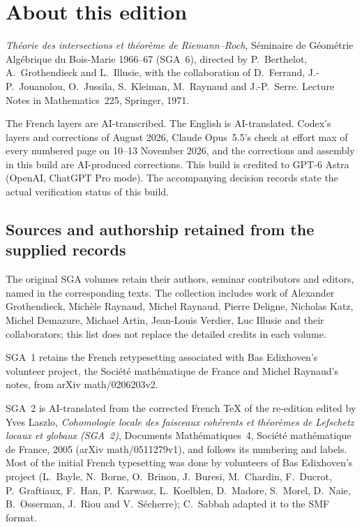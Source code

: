\section*{About this edition}
\textit{Théorie des intersections et théorème de Riemann--Roch},
Séminaire de Géométrie Algébrique du Bois-Marie 1966--67 (SGA~6),
directed by P.~Berthelot, A.~Grothendieck and L.~Illusie, with the collaboration
of D.~Ferrand, J.-P.~Jouanolou, O.~Jussila, S.~Kleiman, M.~Raynaud and
J.-P.~Serre. Lecture Notes in Mathematics~225, Springer, 1971.

The French layers are AI-transcribed. The English is AI-translated.
Codex's layers and corrections of August 2026, Claude Opus~5.5's check at
effort max of every numbered page on 10--13 November 2026, and the corrections
and assembly in this build are AI-produced corrections. This build is credited
to GPT-6 Astra (OpenAI, ChatGPT Pro mode). The accompanying decision records
state the actual verification status of this build.

\subsection*{Sources and authorship retained from the supplied records}
The original SGA volumes retain their authors, seminar contributors and
editors, named in the corresponding texts. The collection includes work of
Alexander Grothendieck, Michèle Raynaud, Michel Raynaud, Pierre Deligne,
Nicholas Katz, Michel Demazure, Michael Artin, Jean-Louis Verdier, Luc Illusie
and their collaborators; this list does not replace the detailed credits in
each volume.

SGA~1 retains the French retypesetting associated with Bas Edixhoven's
volunteer project, the Société mathématique de France and Michel Raynaud's
notes, from arXiv math/0206203v2.

SGA~2 is AI-translated from the corrected French TeX of the re-edition edited
by Yves Laszlo, \textit{Cohomologie locale des faisceaux cohérents et théorèmes
de Lefschetz locaux et globaux (SGA~2)}, Documents Mathématiques~4, Société
mathématique de France, 2005 (arXiv math/0511279v1), and follows its numbering
and labels. Most of the initial French typesetting was done by volunteers of
Bas Edixhoven's project (L.~Bayle, N.~Borne, O.~Brinon, J.~Buresi, M.~Chardin,
F.~Ducrot, P.~Graftiaux, F.~Han, P.~Karwasz, L.~Koelblen, D.~Madore, S.~Morel,
D.~Naie, B.~Osserman, J.~Riou and V.~Sécherre); C.~Sabbah adapted it to the
SMF format.

